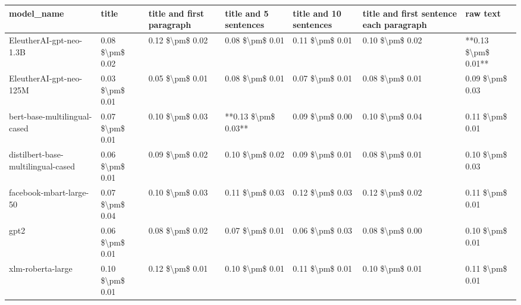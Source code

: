\begin{tabular}{lllllll}
\toprule
                        model\_name &           title & title and first paragraph & title and 5 sentences & title and 10 sentences & title and first sentence each paragraph &            raw text \\
\midrule
           EleutherAI-gpt-neo-1.3B & 0.08 \$\textbackslash pm\$ 0.02 &           0.12 \$\textbackslash pm\$ 0.02 &       0.08 \$\textbackslash pm\$ 0.01 &        0.11 \$\textbackslash pm\$ 0.01 &                         0.10 \$\textbackslash pm\$ 0.02 & **0.13 \$\textbackslash pm\$ 0.01** \\
           EleutherAI-gpt-neo-125M & 0.03 \$\textbackslash pm\$ 0.01 &           0.05 \$\textbackslash pm\$ 0.01 &       0.08 \$\textbackslash pm\$ 0.01 &        0.07 \$\textbackslash pm\$ 0.01 &                         0.08 \$\textbackslash pm\$ 0.01 &     0.09 \$\textbackslash pm\$ 0.03 \\
      bert-base-multilingual-cased & 0.07 \$\textbackslash pm\$ 0.01 &           0.10 \$\textbackslash pm\$ 0.03 &   **0.13 \$\textbackslash pm\$ 0.03** &        0.09 \$\textbackslash pm\$ 0.00 &                         0.10 \$\textbackslash pm\$ 0.04 &     0.11 \$\textbackslash pm\$ 0.01 \\
distilbert-base-multilingual-cased & 0.06 \$\textbackslash pm\$ 0.01 &           0.09 \$\textbackslash pm\$ 0.02 &       0.10 \$\textbackslash pm\$ 0.02 &        0.09 \$\textbackslash pm\$ 0.01 &                         0.08 \$\textbackslash pm\$ 0.01 &     0.10 \$\textbackslash pm\$ 0.03 \\
           facebook-mbart-large-50 & 0.07 \$\textbackslash pm\$ 0.04 &           0.10 \$\textbackslash pm\$ 0.03 &       0.11 \$\textbackslash pm\$ 0.03 &        0.12 \$\textbackslash pm\$ 0.03 &                         0.12 \$\textbackslash pm\$ 0.02 &     0.11 \$\textbackslash pm\$ 0.01 \\
                              gpt2 & 0.06 \$\textbackslash pm\$ 0.01 &           0.08 \$\textbackslash pm\$ 0.02 &       0.07 \$\textbackslash pm\$ 0.01 &        0.06 \$\textbackslash pm\$ 0.03 &                         0.08 \$\textbackslash pm\$ 0.00 &     0.10 \$\textbackslash pm\$ 0.01 \\
                 xlm-roberta-large & 0.10 \$\textbackslash pm\$ 0.01 &           0.12 \$\textbackslash pm\$ 0.01 &       0.10 \$\textbackslash pm\$ 0.01 &        0.11 \$\textbackslash pm\$ 0.01 &                         0.10 \$\textbackslash pm\$ 0.01 &     0.11 \$\textbackslash pm\$ 0.01 \\
\bottomrule
\end{tabular}
